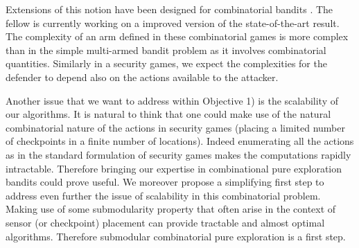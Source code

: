 %
%
%
Extensions of this notion have been designed for combinatorial bandits \cite{chen2014combinatorial}. The fellow is currently working on a improved version of the state-of-the-art result. The complexity of an arm defined in these combinatorial games is  more complex than in the simple multi-armed bandit problem as it involves combinatorial quantities. Similarly in a security games, we expect the complexities for the defender to depend also on the actions available to the attacker.

Another issue that we want to address within Objective 1) is the scalability of our algorithms. It is natural to think that one could make use of the natural combinatorial nature of the actions in security games (placing a limited number of checkpoints in a finite number of locations). Indeed enumerating all the actions as in the standard formulation of security games makes the computations rapidly intractable. Therefore bringing our expertise in combinational pure exploration bandits could prove useful. We moreover propose a simplifying first step to address even further the issue of scalability in  this combinatorial problem. Making use of some submodularity property that often arise in the context of sensor (or checkpoint) placement can provide tractable and almost optimal algorithms. Therefore submodular combinatorial pure exploration is a first step.



